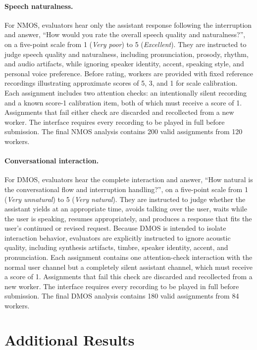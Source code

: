\paragraph{Speech naturalness.}
For NMOS, evaluators hear only the assistant response following the interruption and answer, ``How would you rate the overall speech quality and naturalness?'', on a five-point scale from 1 (\textit{Very poor}) to 5 (\textit{Excellent}).
They are instructed to judge speech quality and naturalness, including pronunciation, prosody, rhythm, and audio artifacts, while ignoring speaker identity, accent, speaking style, and personal voice preference.
Before rating, workers are provided with fixed reference recordings illustrating approximate scores of 5, 3, and 1 for scale calibration.
Each assignment includes two attention checks: an intentionally silent recording and a known score-1 calibration item, both of which must receive a score of 1.
Assignments that fail either check are discarded and recollected from a new worker.
The interface requires every recording to be played in full before submission.
The final NMOS analysis contains 200 valid assignments from 120 workers.


\paragraph{Conversational interaction.}
For DMOS, evaluators hear the complete interaction and answer, ``How natural is the conversational flow and interruption handling?'', on a five-point scale from 1 (\textit{Very unnatural}) to 5 (\textit{Very natural}).
They are instructed to judge whether the assistant yields at an appropriate time, avoids talking over the user, waits while the user is speaking, resumes appropriately, and produces a response that fits the user's continued or revised request.
Because DMOS is intended to isolate interaction behavior, evaluators are explicitly instructed to ignore acoustic quality, including synthesis artifacts, timbre, speaker identity, accent, and pronunciation.
Each assignment contains one attention-check interaction with the normal user channel but a completely silent assistant channel, which must receive a score of 1.
Assignments that fail this check are discarded and recollected from a new worker.
The interface requires every recording to be played in full before submission.
The final DMOS analysis contains 180 valid assignments from 84 workers.



\section{Additional Results}
\label{asec:additional_results}


